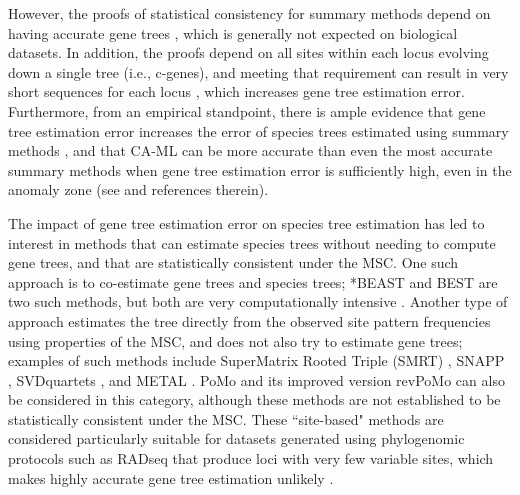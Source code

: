 However, the proofs of statistical consistency for summary methods
depend on having accurate gene trees \cite{roch2015robustness}, which
is generally not expected on biological datasets.  In addition, the
proofs depend on all  sites within each locus evolving down a single tree (i.e., c-genes), and
meeting that requirement can result in very short sequences for each
locus \cite{SpringerGatesy2016}, which increases gene tree estimation
error.  
Furthermore, from an empirical standpoint, there is ample evidence that
gene tree estimation error increases the error of
species trees estimated using summary methods
\cite{huang2010sources,patel2013error,DeGiorgioDegnan2014,GatesyMPE2014,bayzid2013naive,mirarab2016evaluating,SpringerGatesy2016,Meiklejohn2016,MolloyWarnow2017},
and that CA-ML can be more accurate than even the most accurate summary methods when gene tree estimation error is sufficiently high, even in the anomaly zone (see \cite{MolloyWarnow2017} and references therein).

The impact of gene tree estimation error on species tree estimation
has led to interest in methods that can estimate species trees without
needing to compute gene trees, and that are statistically consistent under the MSC.
One such approach is to co-estimate gene
trees and species trees; *BEAST \cite{StarBEAST} and BEST
\cite{Liu2008} are two such methods, but both are very
computationally intensive 
\cite{bayzid2013naive,bbca,knowles2009estimating,mccormack,leavitt2016resolving}.
Another type of approach estimates the tree directly from the observed site pattern frequencies using properties of the MSC,
and does not also try to estimate gene trees; examples of such methods include   
SuperMatrix Rooted Triple (SMRT) \cite{DeGiorgio2010}, SNAPP \cite{bryant2012inferring}, SVDquartets \cite{chifman2014quartet}, and METAL \cite{metal,MosselRoch2015}.
 PoMo \cite{pomo} and its improved version revPoMo \cite{revPomo} can also be considered in this category, although these methods are not established to be statistically consistent under the MSC.
These ``site-based" methods are considered
particularly suitable for  datasets generated using phylogenomic protocols such
as RADseq that produce  
  loci with very few variable sites, which makes highly accurate gene tree estimation 
unlikely
\cite{de2017phylogenomics}.

